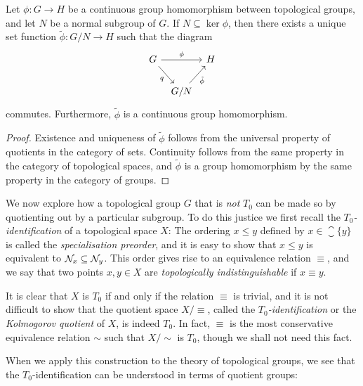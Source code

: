 \documentclass[article, a4paper, 11pt, oneside]{memoir}
\numberwithin{equation}{chapter}
\begin{document}
\begin{proposition}
    Let $\phi \colon G \to H$ be a continuous group homomorphism between topological groups, and let $N$ be a normal subgroup of $G$. If $N \subseteq \ker\phi$, then there exists a unique set function $\tilde{\phi} \colon G/N \to H$ such that the diagram
    \begin{equation*}
        \begin{tikzcd}[column sep=tiny]
            G
                \ar[rr, "\phi"]
                \ar[dr, "q", swap]
            && H
            \\
            & G/N
                \ar[ur, "\tilde{\phi}", swap]
        \end{tikzcd}
    \end{equation*}
    commutes. Furthermore, $\tilde{\phi}$ is a continuous group homomorphism.
\end{proposition}

\begin{proof}
    Existence and uniqueness of $\tilde{\phi}$ follows from the universal property of quotients in the category of sets. Continuity follows from the same property in the category of topological spaces, and $\tilde{\phi}$ is a group homomorphism by the same property in the category of groups.
\end{proof}

We now explore how a topological group $G$ that is \emph{not} $T_0$ can be made so by quotienting out by a particular subgroup. To do this justice we first recall the \emph{$T_0$-identification} of a topological space $X$: The ordering $x \leq y$ defined by $x \in \closure{\{y\}}$ is called the \emph{specialisation preorder}, and it is easy to show that $x \leq y$ is equivalent to $\mathcal{N}_{x} \subseteq \mathcal{N}_{y}$. This order gives rise to an equivalence relation $\equiv$, and we say that two points $x,y \in X$ are \emph{topologically indistinguishable} if $x \equiv y$.

It is clear that $X$ is $T_0$ if and only if the relation $\equiv$ is trivial, and it is not difficult to show that the quotient space $X/{\equiv}$, called the \emph{$T_0$-identification} or the \emph{Kolmogorov quotient} of $X$, is indeed $T_0$. In fact, $\equiv$ is the most conservative equivalence relation $\sim$ such that $X/{\sim}$ is $T_0$, though we shall not need this fact.

When we apply this construction to the theory of topological groups, we see that the $T_0$-identification can be understood in terms of quotient groups:
\end{document}
